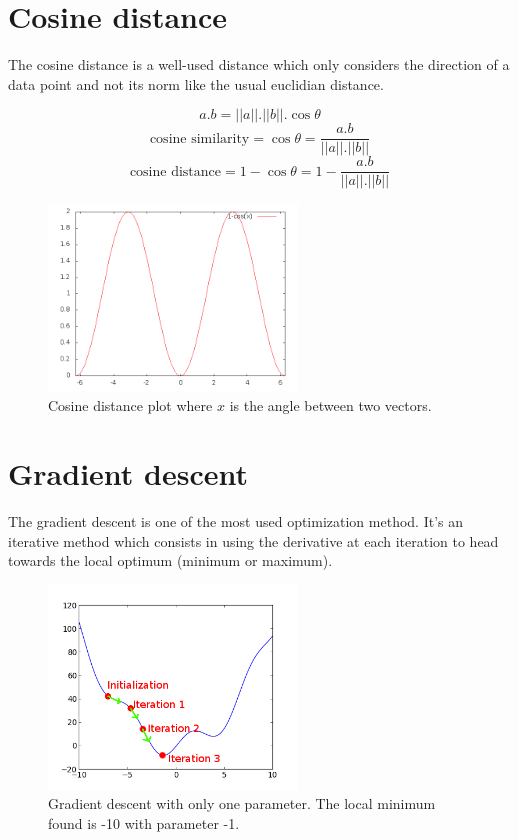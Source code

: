 \documentclass{techrep} %
\begin{document}
\section{Cosine distance}

The cosine distance is a well-used distance which only considers the
direction of a data point and not its norm like the usual euclidian distance.

$$a.b = ||a||.||b||. \cos{\theta}$$
$$\text{cosine similarity} = \cos{\theta} = \frac{a.b}{||a||.||b||}$$
$$\text{cosine distance} = 1 - \cos{\theta} = 1 - \frac{a.b}{||a||.||b||}$$

\begin{figure}[H]
  \centering
  \includegraphics[width=250px]{cosine_distance}
  \caption{Cosine distance plot where $x$ is the angle between two
    vectors.}
  \label{cosine_distance}
\end{figure}

\section{Gradient descent}

The gradient descent is one of the most used optimization method. It's
an iterative method which consists in using the derivative at each
iteration to head towards the local optimum (minimum or maximum).

\begin{figure}[H]
  \centering
  \includegraphics[width=250px]{gradient_descent}
  \caption{Gradient descent with only one parameter. The local minimum found is -10 with parameter -1.}
  \label{gradient_descent}
\end{figure}
\end{document}
